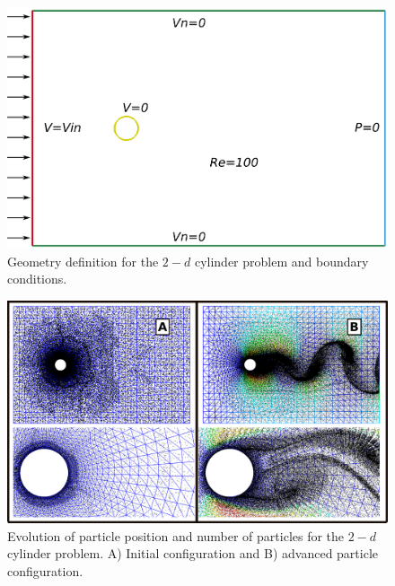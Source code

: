 \begin{figure}[htp] 
\centering 
\includegraphics[scale=.5]{./imgs/cyl_def.png}
\caption{Geometry definition for the $2-d$ cylinder problem and boundary conditions.}
\label{fig:cyl_def}
\end{figure}

\begin{figure}[htp]
\centering 
\includegraphics[scale=.35]{./imgs/cyl_parts.png}
\caption{Evolution of particle position and number of particles for the $2-d$ cylinder problem. A) Initial configuration and B) advanced particle configuration. }
\label{fig:cyl_evol}
\end{figure}

